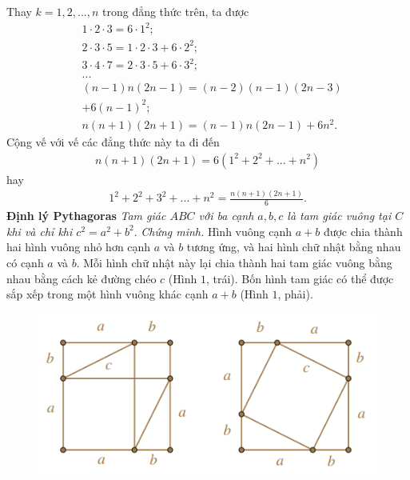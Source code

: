 \begin{multicols}{2}
	Thay $k = 1,2,...,n$  trong đẳng thức trên, ta được
	\begin{align*}
		&1 \cdot 2 \cdot 3 = 6 \cdot {1^2};\\
		&2 \cdot 3 \cdot 5 = 1 \cdot 2 \cdot 3 + 6 \cdot {2^2};\\
		&3 \cdot 4 \cdot 7 = 2 \cdot 3 \cdot 5 + 6 \cdot {3^2};\\
		&...\\
		&\left( {n - 1} \right)n\left( {2n - 1} \right) = \left( {n - 2} \right)\left( {n - 1} \right)\left( {2n - 3} \right)\\
		&+ 6{\left( {n - 1} \right)^2};\\
		&n\left( {n + 1} \right)\left( {2n + 1} \right) = \left( {n - 1} \right)n\left( {2n - 1} \right) + 6{n^2}.
	\end{align*}
	Cộng vế với vế các đẳng thức này ta đi đến
	\begin{align*}
		n\left( {n + 1} \right)\left( {2n + 1} \right) = 6\left( {{1^2} + {2^2} + ... + {n^2}} \right)
	\end{align*}
	hay
	\begin{align*}
		{1^2} + {2^2} + {3^2} + ... + {n^2} = \frac{{n\left( {n + 1} \right)\left( {2n + 1} \right)}}{6}.
	\end{align*}
	\textbf{\color{lichsutoanhoc}Định lý Pythagoras}
	\vskip 0.1cm
	\textit{Tam giác $ABC$ với ba cạnh $a,b,c$  là tam giác vuông tại $C$  khi và chỉ khi $c^2 =a^2 + b^2$}.
	\vskip 0.1cm
	\textit{\color{lichsutoanhoc}Chứng minh.} Hình vuông cạnh $a+b$  được chia thành hai hình vuông nhỏ hơn cạnh $a$  và $b$  tương ứng, và hai hình chữ nhật bằng nhau có cạnh $a$  và $b$.  Mỗi hình chữ nhật này lại chia thành hai tam giác vuông bằng nhau bằng cách kẻ đường chéo $c$ (Hình $1$, trái). Bốn hình tam giác có thể được sắp xếp trong một hình vuông khác cạnh $a+b$ (Hình $1$, phải).  
	\begin{figure}[H]
		\vspace*{-5pt}
		\centering
		\captionsetup{labelformat= empty, justification=centering}
		\includegraphics[width= 1\linewidth]{13}

\end{figure}
\end{multicols}
